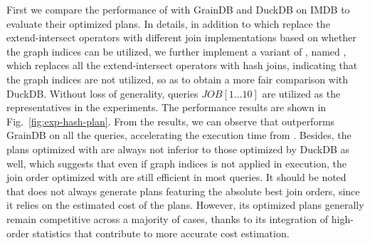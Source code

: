 First we compare the performance of \relgo with GrainDB and DuckDB on IMDB to evaluate their optimized plans.
In details, in addition to \relgo which replace the extend-intersect operators with different join implementations based on whether the graph indices can be utilized, we further implement a variant of \relgo, named \relgohash, which replaces all the extend-intersect operators with hash joins, indicating that the graph indices are not utilized, so as to obtain a more fair comparison with DuckDB.
Without loss of generality, queries $JOB[1\ldots 10]$ are utilized as the representatives in the experiments.
The performance results are shown in Fig.~\ref{fig:exp-hash-plan}. 
From the results, we can observe that \relgo outperforms GrainDB on all the queries, accelerating the execution time from .
Besides, the plans optimized with \relgohash are always not inferior to those optimized by DuckDB as well, which suggests that even if graph indices is not applied in execution, the join order optimized with \relgo are still efficient in most queries.
It should be noted that \relgo does not always generate plans featuring the absolute best join orders, since it relies on the estimated cost of the plans.
However, its optimized plans generally remain competitive across a majority of cases, thanks to its integration of high-order statistics that contribute to more accurate cost estimation.

